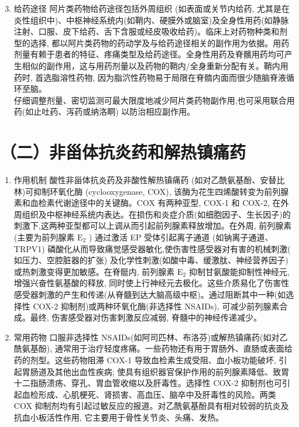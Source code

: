 \documentclass[10pt]{article}
\begin{document}
\begin{enumerate}
  \setcounter{enumi}{2}
  \item 给药途径 阿片类药物给药途径包括外周组织 (如表面或关节内给药, 尤其是在炎性组织中)、中枢神经系统内(如鞘内、硬膜外或脑室)及全身性用药(如静脉注射、口服、皮下给药、舌下含服或经皮吸收给药)。临床上对药物种类和剂型的选择, 都以阿片类药物的药动学及与给药途径相关的副作用为依据。用药剂量有赖于患者的特征、疼痛类型及给药途径。全身性用药及脊髕用药均可产生相似的副作用，这与用药剂量以及药物的鞘内/全身重新分配有关。鞘内用药时, 首选脂溶性药物, 因为脂泬性药物易于局限在脊䯝内面而很少随脑脊液循环至脑。\\
仔细调整剂量、密切监测可最大限度地减少阿片类药物副作用,也可采用联合用药(如止吐药、泻药或纳洛眮) 以防治相应副作用。
\end{enumerate}

\section*{（二）非甾体抗炎药和解热镇痛药}
\begin{enumerate}
  \item 作用机制 酸性非甾体抗炎药及非酸性解热镇痛药 (如对乙酰氨基酚、安替比林)可抑制环氧化酶 (cyclooxygenase, COX), 该酶为花生四烯酸转变为前列腺素和血检素代谢途径中的关键酶。COX 有两种亚型, COX-1 和 COX-2, 在外周组织及中枢神经系统内表达。在损伤和炎症介质(如细胞因子、生长因子)的刺激下,这两种亚型都可以上调从而引起前列腺素释放增加。在外周, 前列腺素 (主要为前列腺素 $\mathrm{E}_{2}$ ) 通过激活 EP 受体引起离子通道 (如钠离子通道、 TRPV1) 磷酸化从而导致痛觉感受器敏化,使伤害性感受器对有害的机械刺激( 如压力、空腔脏器的扩张) 及化学性刺激(如酸中毒、缓激肽、神经营养因子)或热刺激变得更加敏感。在脊䯕内, 前列腺素 $\mathrm{E}_{2}$ 抑制甘氨酸能抑制性神经元, 增强兴奋性氨基酸的释放, 同时使上行神经元去极化。这些介质易化了伤害性感受器刺激的产生和传递(从脊髓到达大脑高级中枢)。通过阻断其中一种(如选择性 COX-2 抑制剂)或两种环氧化酶(非选择性 NSAIDs), 可减少前列腺素合成。最终, 伤害感受器对伤害刺激反应减弱, 脊髓中的神经传递减少。

  \item 常用药物 口服非选择性 NSAIDs(如阿司匹林、布洛芬)或解热镇痛药(如对乙酰氨基酚), 通常用于治疗轻度疼痛。一些药物还有用于胃肠外、直肠或表面给药的剂型。这些药物阻滞 COX-1 导致血检素生成受阻、血小板功能破坏, 引起胃肠道及其他出血性疾病; 使具有组织器官保护作用的前列腺素降低、致胃十二指肠溃疡、穿孔、胃血管收缩以及肝毒性。选择性 COX-2 抑制剂也可引起血检形成、心肌梗死、肾损害、高血压、脑卒中及肝毒性的风险。两类 COX 抑制剂均有引起过敏反应的报道。对乙酰氨基酚具有相对较弱的抗炎及抗血小板活性作用, 它主要用于骨性关节炎、头痛、发热。

\end{enumerate}
\end{document}
